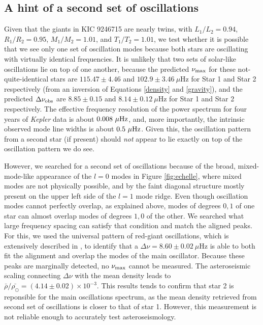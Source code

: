 \subsection{A hint of a second set of oscillations}\label{search}
\label{subsubsec_second_osc}

Given that the giants in KIC 9246715 are nearly twins, with $L_1/L_2 = 0.94$, $R_1/R_2 = 0.95$, $M_1/M_2 = 1.01$, and $T_1/T_2 = 1.01$, we test whether it is possible that we see only one set of oscillation modes because both stars are oscillating with virtually identical frequencies. It is unlikely that two sets of solar-like oscillations lie on top of one another, because the predicted $\nu_{\rm{max}}$ for these not-quite-identical stars are $115.47 \pm 4.46$ and $102.9 \pm 3.46\ \mu$Hz for Star 1 and Star 2 respectively (from an inversion of Equations \ref{density} and \ref{gravity}), and the predicted $\Delta\nu_{\rm{obs}}$ are $8.85 \pm 0.15$ and $8.14 \pm 0.12 \ \mu$Hz for Star 1 and Star 2 respectively. The effective frequency resolution of the power spectrum for four years of \emph{Kepler} data is about $0.008 \ \mu \rm{Hz}$, and, more importantly, the intrinsic observed mode line widths is about $0.5 \ \mu \rm{Hz}$. Given this, the oscillation pattern from a second star (if present) should \emph{not} appear to lie exactly on top of the oscillation pattern we do see.

However, we searched for a second set of oscillations because of the broad, mixed-mode-like appearance of the $l=0$ modes in Figure \ref{fig:echelle}, where mixed modes are not physically possible, and by the faint diagonal structure mostly present on the upper left side of the $l=1$ mode ridge. Even though oscillation modes cannot perfectly overlap, as explained above, modes of degrees $0,1$ of one star can almost overlap modes of degrees $1,0$ of the other. We searched what large frequency spacing can satisfy that condition and match the aligned peaks. For this, we used the universal pattern of red-giant oscillations, which is extensively described in \citet{mos11}, to identify that a $\Delta\nu = 8.60\pm0.02\ \mu$Hz is able to both fit the alignment and overlap the modes of the main oscillator. Because these peaks are marginally detected, no $\nu_{\rm{max}}$ cannot be measured. The asteroseismic scaling connecting $\Delta\nu$ with the mean density leads to $\bar{\rho}/\bar{\rho_\odot} = (4.14 \pm 0.02)\times 10^{-3}$. This results tends to confirm that star 2 is reponsible for the main oscillations spectrum, as the mean density retrieved from second set of oscillations is closer to that of star 1. However, this measurement is not reliable enough to accurately test asteroseismology.  

